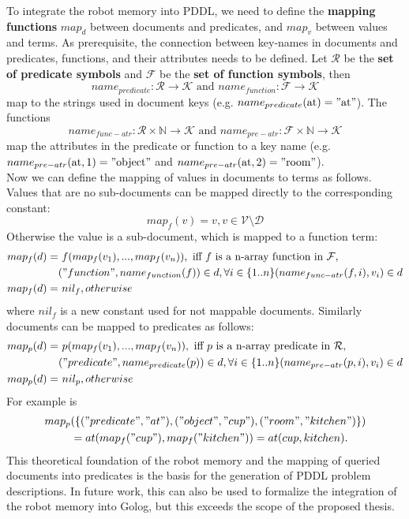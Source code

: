 \documentclass[a4paper,11pt]{article}
\begin{document}
To integrate the robot memory into PDDL, we need to define the
\textbf{mapping functions} $map_d$ between documents and predicates, and
$map_v$ between values and terms. As prerequisite, the connection
between key-names in documents and predicates, functions, and their
attributes needs to be defined. Let $\mathcal{R}$ be the \textbf{set
  of predicate symbols} and $\mathcal{F}$ be the \textbf{set of function
  symbols}, then
%
$$name_{predicate}: \mathcal{R} \rightarrow \mathcal{K}
\text{ and } name_{function}: \mathcal{F} \rightarrow \mathcal{K}$$
%
map to the strings used in document keys
(e.g. $name_{predicate}(\text{at})="\text{at}"$). The functions
%
$$ name_{func-atr}: \mathcal{R} \times \mathbb{N} \rightarrow
\mathcal{K}
\text{ and } name_{pre-atr}: \mathcal{F} \times \mathbb{N} \rightarrow
\mathcal{K}$$
%
map the attributes in the predicate or function to a key
name (e.g. $name_{pre-atr}(\text{at},1)="\text{object}"$ and
$name_{pre-atr}(\text{at},2)="\text{room}"$).
\\
Now we can define the mapping of values in documents to terms as
follows. Values that are no sub-documents can be mapped directly to
the corresponding constant:
$$map_f(v)=v, v \in \mathcal{V} \setminus \mathcal{D}$$
Otherwise the value is a sub-document, which is mapped to a function term:
\begin{align*}
  map_f(d)= &\text{ }f(map_f(v_1), ..., map_f(v_n)), \text{ iff } f \text{ is a n-array function in } \mathcal{F},\\
  &("function", name_{function}(f))\in d,
  \forall i \in \{1..n\} (name_{func-atr}(f,i), v_i)\in d\\
  map_f(d)= &\text{ } nil_f, otherwise\text{~~~~~~~~~~~~~~~}
\end{align*}
where $nil_f$ is a new constant used for not mappable documents.
Similarly documents can be mapped to predicates as follows:
\begin{align*}
  map_p(d)=&\text{ }p(map_f(v_1), ..., map_f(v_n)), \text{ iff } p \text{ is a n-array predicate in } \mathcal{R},\\
  &("predicate", name_{predicate}(p))\in d,
  \forall i \in \{1..n\} (name_{pre-atr}(p,i), v_i)\in d\\
  map_p(d)=& \text{ }nil_p, otherwise\text{~~~~~~~~~~~~~~~}
\end{align*}
For example is
\begin{align*}
map_p&(\{("predicate", "at"),("object", "cup"),("room",
"kitchen")\})\\
&= at(map_f("cup"), map_f("kitchen")) = at(cup, kitchen) \text{.}
\end{align*}
This theoretical foundation of the robot memory and the mapping of
queried documents into predicates is the basis for the generation of
PDDL problem descriptions. In future work, this can also be used to
formalize the integration of the robot memory into Golog, but this
exceeds the scope of the proposed thesis.
\end{document}
